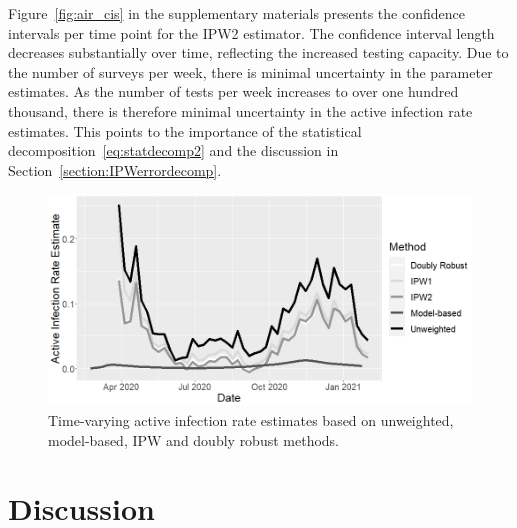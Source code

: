 \documentclass[11pt]{amsart}
\numberwithin{equation}{section}
\theoremstyle{plain}
\begin{document}
Figure~\ref{fig:air_cis} in the supplementary materials presents the confidence intervals per time point for the IPW2 estimator.  The confidence interval length decreases substantially over time, reflecting the increased testing capacity.  Due to the number of surveys per week, there is minimal uncertainty in the parameter estimates.  As the number of tests per week increases to over one hundred thousand, there is therefore minimal uncertainty in the active infection rate estimates. This points to the importance of the statistical decomposition~\eqref{eq:statdecomp2} and the discussion in Section~\ref{section:IPWerrordecomp}.


 \begin{figure}[!th]
 \centering
 \includegraphics[width=.7\linewidth]{../figs/tv_air.png}
 \caption{Time-varying active infection rate estimates based on unweighted, model-based, IPW and doubly robust methods.}
 \label{fig:tvestimates}
 \end{figure}

 \section{Discussion}
 \label{section:discussion}
\end{document}
